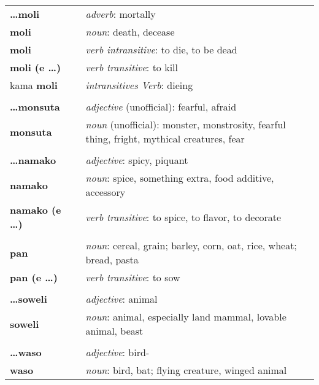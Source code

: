 \begin{supertabular}{p{2,5cm}|ll}
\textbf{\dots moli} && \textit{adverb}: mortally \\ %
\textbf{moli} && \textit{noun}: death, decease \\ %
\textbf{moli} && \textit{verb intransitive}: to die, to be dead \\ %
\textbf{moli (e \dots)} && \textit{verb transitive}: to kill \\ %
kama \textbf{moli} && \textit{intransitives Verb}: dieing \\ %
 && \\ %
%
\textbf{\dots monsuta} && \textit{adjective} (unofficial): fearful, afraid \\ %
\textbf{monsuta} && \textit{noun} (unofficial): monster, monstrosity, fearful thing, fright, mythical creatures, fear \\ %
 && \\ %
%
\textbf{\dots namako} && \textit{adjective}: spicy, piquant \\ 
\textbf{namako} && \textit{noun}: spice, something extra, food additive, accessory \\ %
\textbf{namako (e \dots)} && \textit{verb transitive}: to spice, to flavor, to decorate \\ %
 && \\ %
%
\textbf{pan} && \textit{noun}: cereal, grain; barley, corn, oat, rice, wheat; bread, pasta \\ %
\textbf{pan (e \dots)} && \textit{verb transitive}: to sow \\ %
 && \\ %
%
\textbf{\dots soweli} && \textit{adjective}: animal \\ %
\textbf{soweli} && \textit{noun}: animal, especially land mammal, lovable animal, beast \\ %
 && \\ %
%
\textbf{\dots waso} && \textit{adjective}: bird- \\ %
\textbf{waso} && \textit{noun}: bird, bat; flying creature, winged animal \\ %
%
\end{supertabular} \\
%
%
%
\newpage
%
